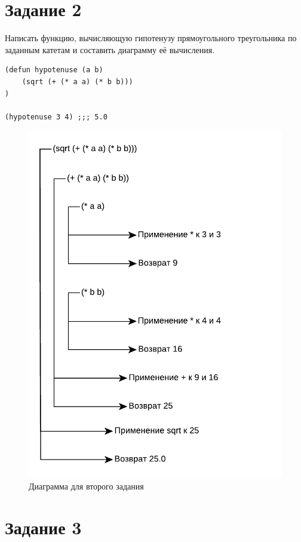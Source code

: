 \section{Задание \No{}2}

Написать функцию, вычисляющую гипотенузу прямоугольного
треугольника по заданным катетам и составить диаграмму её вычисления.

\begin{lstlisting}
(defun hypotenuse (a b)
    (sqrt (+ (* a a) (* b b)))
)

(hypotenuse 3 4) ;;; 5.0
\end{lstlisting}

\begin{figure}[H]
    \centering
    \includegraphics[scale=0.85]{data/pdf/task_7.pdf}
    \caption{Диаграмма для второго задания}
\end{figure}


\section{Задание \No{}3}

